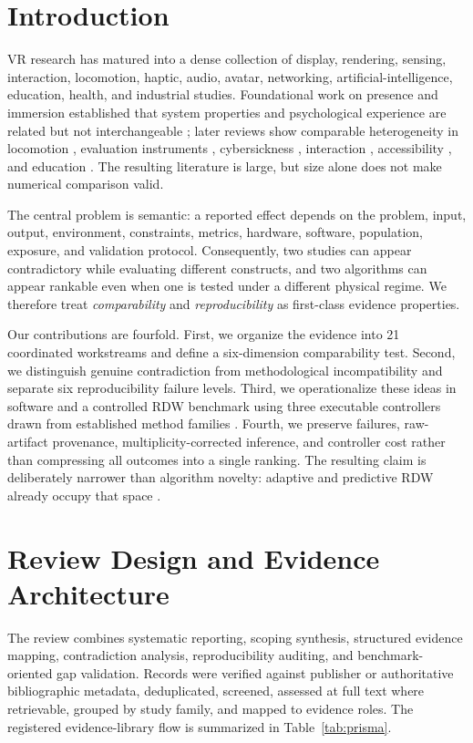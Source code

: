 \section{Introduction}
VR research has matured into a dense collection of display, rendering, sensing, interaction, locomotion, haptic, audio, avatar, networking, artificial-intelligence, education, health, and industrial studies. Foundational work on presence and immersion established that system properties and psychological experience are related but not interchangeable \cite{Slater2009PlaceIllusion,Witmer1998Presence,Cummings2016ImmersionPresence}; later reviews show comparable heterogeneity in locomotion \cite{Li2022RDWReview,Fan2023RDWReview}, evaluation instruments \cite{Bareisyte2024Questionnaires}, cybersickness \cite{Caserman2021Cybersickness}, interaction \cite{Monteiro2021HandsFree}, accessibility \cite{Dudley2023InclusiveImmersion}, and education \cite{Merchant2014VREducationMeta}. The resulting literature is large, but size alone does not make numerical comparison valid.

The central problem is semantic: a reported effect depends on the problem, input, output, environment, constraints, metrics, hardware, software, population, exposure, and validation protocol. Consequently, two studies can appear contradictory while evaluating different constructs, and two algorithms can appear rankable even when one is tested under a different physical regime. We therefore treat \emph{comparability} and \emph{reproducibility} as first-class evidence properties.

Our contributions are fourfold. First, we organize the evidence into 21 coordinated workstreams and define a six-dimension comparability test. Second, we distinguish genuine contradiction from methodological incompatibility and separate six reproducibility failure levels. Third, we operationalize these ideas in software and a controlled RDW benchmark using three executable controllers drawn from established method families \cite{Williams2021VisibilityPolygons,Thomas2019P2R}. Fourth, we preserve failures, raw-artifact provenance, multiplicity-corrected inference, and controller cost rather than compressing all outcomes into a single ranking. The resulting claim is deliberately narrower than algorithm novelty: adaptive and predictive RDW already occupy that space \cite{Azmandian2022Adaptive,Strauss2020RL,Chen2024APFS2T,Wang2026DGMRDW}.

\section{Review Design and Evidence Architecture}
The review combines systematic reporting, scoping synthesis, structured evidence mapping, contradiction analysis, reproducibility auditing, and benchmark-oriented gap validation. Records were verified against publisher or authoritative bibliographic metadata, deduplicated, screened, assessed at full text where retrievable, grouped by study family, and mapped to evidence roles. The registered evidence-library flow is summarized in Table~\ref{tab:prisma}.


